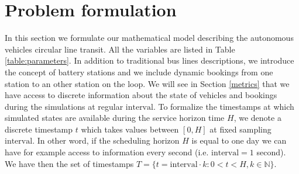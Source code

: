 \documentclass[12pt,a4paper]{article}
\begin{document}
\section{Problem formulation}
In this section we formulate our mathematical model describing the autonomous vehicles circular line transit. All the variables are listed in Table \ref{table:parameters}. In addition to traditional bus lines descriptions, we introduce the concept of battery stations and we include dynamic bookings from one station to an other station on the loop. We will see in Section \ref{metrics} that we have access to discrete information about the state of vehicles and bookings during the simulations at regular $\text{interval}$. To formalize the timestamps at which simulated states are available during the service horizon time $H$, we denote a discrete timestamp $t$ which takes values between $[0, H]$ at fixed sampling $\text{interval}$. In other word, if the scheduling horizon $H$ is equal to one day we can have for example access to information every second (i.e. $\text{interval} = 1$ second). We have then the set of timestamps $T =\{t = \text{interval} \cdot k:  0 < t < H, k \in \mathbb{N}\}$.
\end{document}
